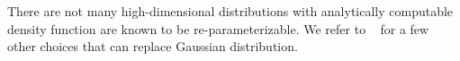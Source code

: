 \documentclass{article}
\begin{document}
There are not many high-dimensional distributions with analytically computable density function are known to be re-parameterizable. We refer to ~\cite{kingma2013auto} for a few other choices that can replace Gaussian distribution. 
%
%





\end{document}
